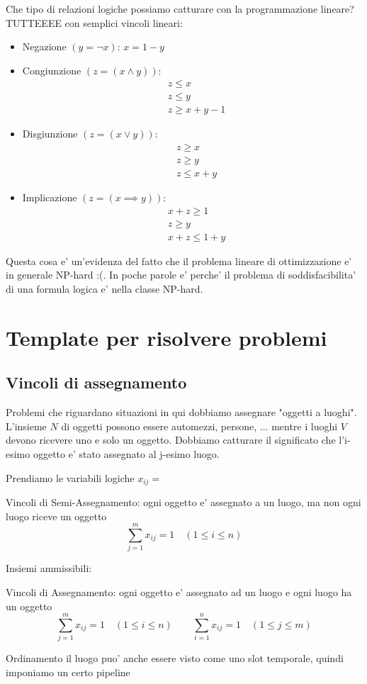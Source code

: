 Che tipo di relazioni logiche possiamo catturare con la programmazione lineare? TUTTEEEE con semplici vincoli lineari:
\begin{itemize}
  \item Negazione $ (y = \neg x) $: $ x = 1-y $
  \item Congiunzione $ (z = (x \land y)) $: 
    \[
    \begin{aligned}
      &z \leq x\\
      &z \leq y\\
      &z \geq x + y -1
    \end{aligned}
    \]
  \item Disgiunzione $ (z = (x \lor y)) $: 
    \[
    \begin{aligned}
      &z \geq x\\
      &z \geq y\\
      &z \leq x + y
    \end{aligned}
    \]
  \item Implicazione $ (z = (x \implies y)) $:
    \[
    \begin{aligned}
      &x+z \geq 1\\
      &z \geq y\\
      &x+z \leq 1 + y
    \end{aligned}
    \]
\end{itemize}

Questa cosa e' un'evidenza del fatto che il problema lineare di ottimizzazione e' in generale NP-hard :(. In poche parole e' perche' il problema di soddisfacibilita' di una formula logica e' nella classe NP-hard.

\section{Template per risolvere problemi}

\subsection{Vincoli di assegnamento}

Problemi che riguardano situazioni in qui dobbiamo assegnare "oggetti a luoghi". L'insieme $ N $ di oggetti possono essere automezzi, persone, ... mentre i luoghi $ V $ devono ricevere uno e solo un oggetto. Dobbiamo catturare il significato che l'i-esimo oggetto e' stato assegnato al j-esimo luogo.

Prendiamo le variabili logiche $ x_{ij} =  $

Vincoli di Semi-Assegnamento: ogni oggetto e' assegnato a un luogo, ma non ogni luogo riceve un oggetto
\[
  \sum_{j=1}^{m} x_{ij} = 1 \quad (1 \leq i \leq n)
\]

Insiemi ammissibili:

Vincoli di Assegnamento: ogni oggetto e' assegnato ad un luogo e ogni luogo ha un oggetto
\[
  \sum_{j=1}^{m} x_{ij} = 1 \quad (1 \leq i \leq n) \qquad \sum_{i=1}^{n} x_{ij} = 1 \quad (1 \leq j \leq m)
\]

Ordinamento
il luogo puo' anche essere visto come uno slot temporale, quindi imponiamo un certo pipeline

% 
